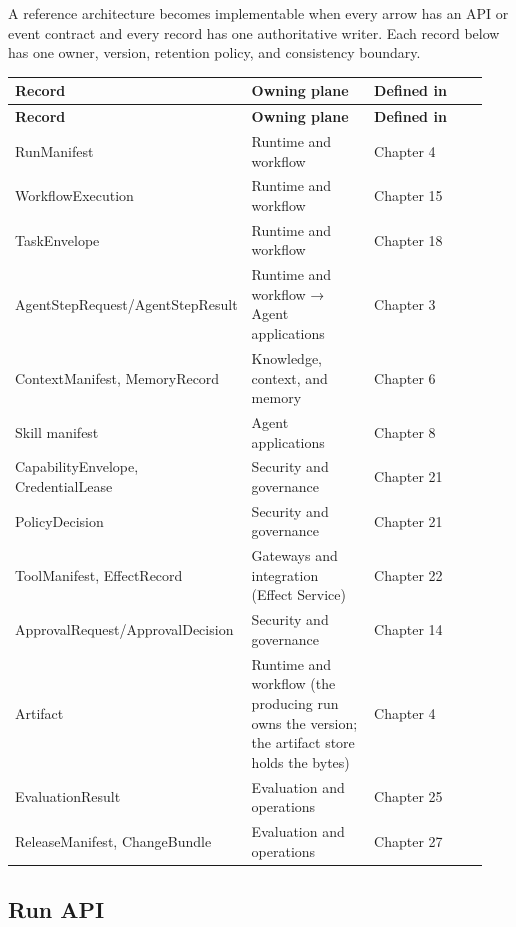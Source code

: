 A reference architecture becomes implementable when every arrow has an API or event contract and every record has one authoritative writer. Each record below has one owner, version, retention policy, and consistency boundary.\par

\BookTableStart
\small
\begin{longtable}{@{}Y{0.3133\linewidth}Y{0.3133\linewidth}Y{0.3133\linewidth}@{}}
\color{white}\bfseries \textbf{Record} & \color{white}\bfseries \textbf{Owning plane} & \color{white}\bfseries \textbf{Defined in} \\
\endfirsthead
{}
\color{white}\bfseries \textbf{Record} & \color{white}\bfseries \textbf{Owning plane} & \color{white}\bfseries \textbf{Defined in} \\
\endhead
RunManifest & Runtime and workflow & Chapter 4 \\
WorkflowExecution & Runtime and workflow & Chapter 15 \\
TaskEnvelope & Runtime and workflow & Chapter 18 \\
AgentStepRequest/AgentStepResult & Runtime and workflow → Agent applications & Chapter 3 \\
ContextManifest, MemoryRecord & Knowledge, context, and memory & Chapter 6 \\
Skill manifest & Agent applications & Chapter 8 \\
CapabilityEnvelope, CredentialLease & Security and governance & Chapter 21 \\
PolicyDecision & Security and governance & Chapter 21 \\
ToolManifest, EffectRecord & Gateways and integration (Effect Service) & Chapter 22 \\
ApprovalRequest/ApprovalDecision & Security and governance & Chapter 14 \\
Artifact & Runtime and workflow (the producing run owns the version; the artifact store holds the bytes) & Chapter 4 \\
EvaluationResult & Evaluation and operations & Chapter 25 \\
ReleaseManifest, ChangeBundle & Evaluation and operations & Chapter 27 \\
\end{longtable}
\BookTableEnd

\subsection{Run API}

